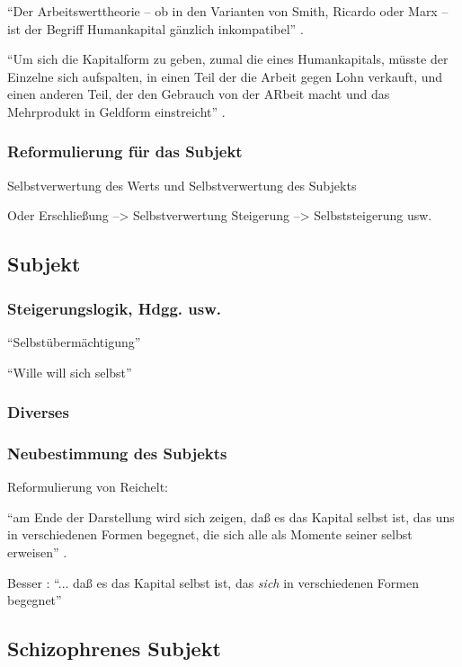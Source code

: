 \documentclass[12pt,
               DIV13,
               paper=a4,
               twoside=false,
               onehalfspacing,
               bibliography=totoc,
               toc=graduated,
               draft,
               ]{scrartcl}
\newcommand{\pc}[2]{\parencite[#1]{#2}}
\newcommand{\worries}[1]{\ifdraft{\textcolor{blue}{\texttt{(#1)}}}{}}
\begin{document}
"`Der Arbeitswerttheorie -- ob in den Varianten von Smith, Ricardo
oder Marx -- ist der Begriff Humankapital gänzlich inkompatibel"'
\pc{124}{strauss}.

"`Um sich die Kapitalform zu geben, zumal die eines Humankapitals,
müsste der Einzelne sich aufspalten, in einen Teil der die Arbeit
gegen Lohn verkauft, und einen anderen Teil, der den Gebrauch von der
ARbeit macht und das Mehrprodukt in Geldform einstreicht"'
\pc{126}{strauss}.

\subsubsection{Reformulierung für das Subjekt}

Selbstverwertung des Werts und Selbstverwertung des Subjekts

Oder Erschließung --> Selbstverwertung
Steigerung --> Selbststeigerung usw.

\subsection{Subjekt}

\subsubsection{Steigerungslogik, Hdgg. usw.}

"`Selbstübermächtigung"'

"`Wille will sich selbst"'

\subsubsection{Diverses}

\subsubsection{Neubestimmung des Subjekts}

Reformulierung von Reichelt:

"`am Ende der Darstellung wird sich zeigen, daß es das Kapital selbst
ist, das uns in verschiedenen Formen begegnet, die sich alle als
Momente seiner selbst erweisen"' \pc{181}{reichelt}.

Besser \worries{?}: "`... daß es das Kapital selbst ist, das
\emph{sich} in verschiedenen Formen begegnet"'

\subsection{Schizophrenes Subjekt}
\end{document}
